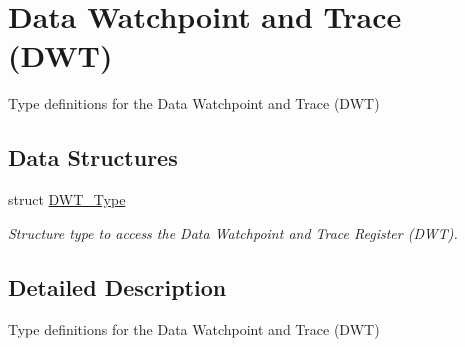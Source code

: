 \hypertarget{group___c_m_s_i_s___d_w_t}{\section{Data Watchpoint and Trace (D\-W\-T)}
\label{group___c_m_s_i_s___d_w_t}
}


Type definitions for the Data Watchpoint and Trace (D\-W\-T)  


\subsection*{Data Structures}
\begin{DoxyCompactItemize}
\item 
struct \hyperlink{struct_d_w_t___type}{D\-W\-T\-\_\-\-Type}
\begin{DoxyCompactList}\small\item\em Structure type to access the Data Watchpoint and Trace Register (D\-W\-T). \end{DoxyCompactList}\end{DoxyCompactItemize}


\subsection{Detailed Description}
Type definitions for the Data Watchpoint and Trace (D\-W\-T) 